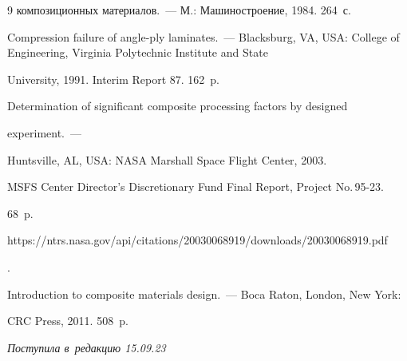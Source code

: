 {{\begin{thebibliography}{9}
композиционных материалов.~--- М.: Машиностроение, 1984. 264~с.




 Compression failure of angle-ply laminates.~--- Blacksburg, VA, USA: College of Engineering, Virginia Polytechnic Institute and State 


University, 1991. Interim Report 87. 162~p.




 Determination of significant composite processing factors by designed 


experiment.~--- 


Huntsville, AL, USA: NASA Marshall Space Flight Center, 2003. 


MSFS Center Director's Discretionary Fund Final Report, Project No.\,95-23.


68~p. {\sf 


https://ntrs.nasa.gov/api/citations/20030068919/downloads/20030068919.pdf}.




 Introduction to composite materials design.~--- Boca Raton, London, New York: 


CRC Press, 2011. 508~p. 





   \end{thebibliography}


} }











\vspace*{-6pt}





\hfill{\small\textit{Поступила в~редакцию 15.09.23}}


























